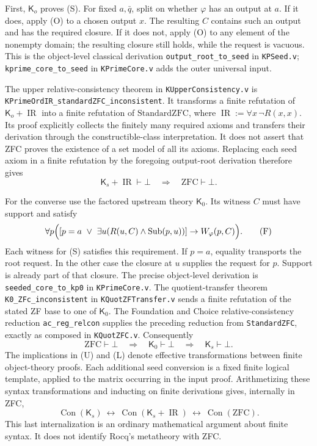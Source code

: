 First, $\mathsf K_o$ proves (S).  For fixed $a,\bar q$, split on
whether $\varphi$ has an output at $a$.  If it does, apply (O) to a
chosen output $x$.  The resulting $C$ contains such an output and has
the required closure.  If it does not, apply (O) to any element of the
nonempty domain; the resulting closure still holds, while the request
is vacuous.  This is the object-level classical derivation
\texttt{output\_root\_to\_seed} in \texttt{KPSeed.v};
\texttt{kprime\_core\_to\_seed} in \texttt{KPrimeCore.v} adds the
outer universal input.

The upper relative-consistency theorem in
\texttt{KUpperConsistency.v} is
\nolinkurl{KPrimeOrdIR_standardZFC_inconsistent}.
It transforms a finite refutation of
$\mathsf K_o+\operatorname{IR}$ into a finite refutation of
$\mathrm{StandardZFC}$, where
$\operatorname{IR}:=\forall x\,\neg R(x,x)$.
Its proof explicitly collects the finitely many required axioms and
transfers their derivation through the constructible-class
interpretation.  It does not assert that ZFC proves the existence of a
set model of all its axioms.  Replacing each seed axiom in a finite
refutation by the foregoing output-root derivation therefore gives
\[
 \mathsf K_s+\operatorname{IR}\vdash\bot
       \quad\Longrightarrow\quad\mathrm{ZFC}\vdash\bot.
                                                        \tag{U}
\]

For the converse use the factored upstream theory $\mathsf K_0$.
Its witness $C$ must have support and satisfy
\[
 \forall p\Bigl(
   [p=a\ \lor\ \exists u(R(u,C)\land\operatorname{Sub}(p,u))]
     \to W_\varphi(p,C)\Bigr).                            \tag{F}
\]
Each witness for (S) satisfies this requirement.  If $p=a$, equality
transports the root request.  In the other case the closure at $u$
supplies the request for $p$.  Support is already part of that closure.
The precise object-level derivation is
\texttt{seeded\_core\_to\_kp0} in \texttt{KPrimeCore.v}.
The quotient-transfer theorem \texttt{K0\_ZFc\_inconsistent} in
\texttt{KQuotZFTransfer.v} sends a finite refutation of the stated ZF
base to one of $\mathsf K_0$.  The Foundation and Choice
relative-consistency reduction \texttt{ac\_reg\_relcon} supplies the
preceding reduction from \texttt{StandardZFC}, exactly as composed in
\texttt{KQuotZFC.v}.  Consequently
\[
 \mathrm{ZFC}\vdash\bot
       \quad\Longrightarrow\quad\mathsf K_0\vdash\bot
       \quad\Longrightarrow\quad\mathsf K_s\vdash\bot.
                                                        \tag{L}
\]
The implications in (U) and (L) denote effective transformations
between finite object-theory proofs.  Each additional seed conversion
is a fixed finite logical template, applied to the matrix occurring in
the input proof.  Arithmetizing these syntax transformations and
inducting on finite derivations gives, internally in ZFC,
\[
 \operatorname{Con}(\mathsf K_s)
 \ \longleftrightarrow\
 \operatorname{Con}(\mathsf K_s+\operatorname{IR})
 \ \longleftrightarrow\
 \operatorname{Con}(\mathrm{ZFC}).
\]
This last internalization is an ordinary mathematical argument about
finite syntax.  It does not identify Rocq's metatheory with ZFC.

